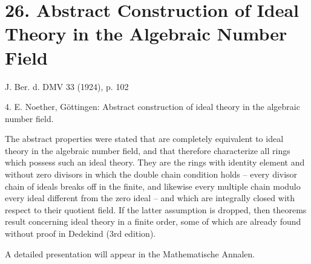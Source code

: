 ﻿\section*{26. Abstract Construction of Ideal Theory in the Algebraic Number Field}

\begin{center}
J. Ber. d. DMV 33 (1924), p. 102
\end{center}

4. E. Noether, Göttingen: Abstract construction of ideal theory in the algebraic number field.

The abstract properties were stated that are completely equivalent to ideal theory in the algebraic number field, and that therefore characterize all rings which possess such an ideal theory. They are the rings with identity element and without zero divisors in which the double chain condition holds -- every divisor chain of ideals breaks off in the finite, and likewise every multiple chain modulo every ideal different from the zero ideal -- and which are integrally closed with respect to their quotient field. If the latter assumption is dropped, then theorems result concerning ideal theory in a finite order, some of which are already found without proof in Dedekind (3rd edition).

A detailed presentation will appear in the Mathematische Annalen.

